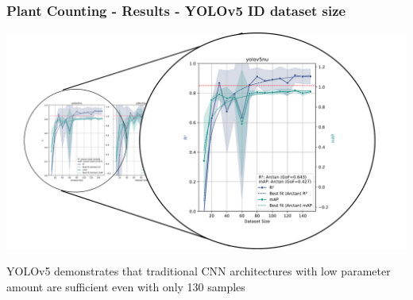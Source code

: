 \documentclass[aspectratio=43]{beamer}
\begin{document}
\begin{frame}
    \frametitle{Plant Counting - Results - YOLOv5 ID dataset size}
    
    \begin{center}
        \includegraphics[width=1\textwidth]{Imgs/r2_ap_vs_dataset_size_yolov5_2.pdf}
    \end{center}
    
    YOLOv5 demonstrates that traditional CNN architectures with low parameter amount are sufficient even with only 130 samples

\end{frame}
\end{document}
